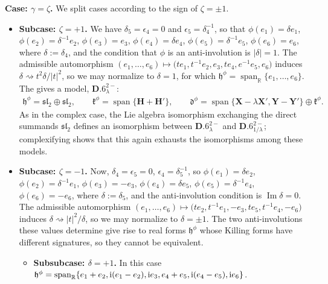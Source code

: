 \documentclass[10pt,a4paper]{amsart}
\newlength{\caseIndent}
\DeclareMathOperator{\spanOperator}{span}
\renewcommand{\Im}{\operatorname{Im}}
\newcommand{\Span}[1]{\spanOperator\{{#1}\}}
\newcommand{\bbR}{\mathbb{R}}
\newcommand{\mbH}{\mathbf{H}}
\newcommand{\mbX}{\mathbf{X}}
\newcommand{\mbY}{\mathbf{Y}}
\newcommand{\mfd} {\mathfrak{d}}
\newcommand{\mfh} {\mathfrak{h}}
\newcommand{\mfk} {\mathfrak{k}}
\newcommand{\mfsl} {\mathfrak{sl}}
\numberwithin{equation}{section}
\begin{document}
\noindent \textbf{Case: $\gamma = \zeta$.} We split cases according to the sign of $\zeta = \pm 1$.
\begin{itemize}[leftmargin=\caseIndent]\itemsep=0pt
	\item[] \textbf{Subcase: $\zeta = +1$.} We have $\delta_5 = \epsilon_4 = 0$ and $\epsilon_5 = \delta_4^{-1}$, so that $\phi(e_1) = \delta e_1$, $\phi(e_2) = \delta^{-1} e_2$, $\phi(e_3) = e_3$, $\phi(e_4) = \delta e_4$, $\phi(e_5) = \delta^{-1} e_5$, $\phi(e_6) = e_6$, where $\delta := \delta_4$, and the condition that $\phi$ is an anti-involution is $|\delta| = 1$. The admissible automorphism $(e_1, \ldots, e_6) \mapsto \big(t e_1, t^{-1} e_2, e_3, t e_4, e^{-1} e_5, e_6\big)$ induces $\delta \rightsquigarrow t^2 \delta / |t|^2$, so we may normalize to $\delta = 1$, for which $\mfh^{\phi} = \spanOperator_{\bbR}\{e_1, \ldots, e_6\}$. The gives a model, $\mathbf{D.6}_{\lambda}^{2-}$:
	\begin{gather*}
		\boxed{
			\mfh^{\phi} = \mfsl_2 \oplus \mfsl_2, \qquad
			\mfk^{\phi} = \Span{\mbH + \mbH'} , \qquad
			\mfd^{\phi} = \Span{\mbX - \lambda \mbX', \mbY - \mbY'} \oplus \mfk^{\phi} .
		}
	\end{gather*}
	As in the complex case, the Lie algebra isomorphism exchanging the direct summands $\mfsl_2$ defines an isomorphism between $\mathbf{D.6}_{\lambda}^{2-}$ and $\mathbf{D.6}_{1 / \lambda}^{2-}$; complexifying shows that this again exhausts the isomorphisms among these models.
	\item[] \textbf{Subcase: $\zeta = -1$.} Now, $\delta_4 = \epsilon_5 = 0$, $\epsilon_4 = \delta_5^{-1}$, so $\phi(e_1) = \delta e_2$, $\phi(e_2) = \delta^{-1} e_1$, $\phi(e_3) = -e_3$, $\phi(e_4) = \delta e_5$, $\phi(e_5) = \delta^{-1} e_4$, $\phi(e_6) = -e_6$, where $\delta := \delta_5$, and the anti-involution condition is $\Im \delta = 0$. The admissible automorphism $(e_1, \ldots, e_6) \mapsto \big(t e_2, t^{-1} e_1, -e_3, t e_5, t^{-1} e_4, -e_6\big)$ induces $\delta \rightsquigarrow |t|^2 / \delta$, so we may normalize to $\delta = \pm 1$. The two anti-involutions these values determine give rise to real forms $\mfh^{\phi}$ whose Killing forms have different signatures, so they cannot be equivalent.
\begin{itemize}[leftmargin=\caseIndent]\itemsep=0pt
	\item[] \textbf{Subsubcase: $\delta = +1$.} In this case $\mfh^{\phi} = \spanOperator_{\bbR}\{e_1 + e_2, {\rm i} (e_1 - e_2), {\rm i} e_3, e_4 + e_5, {\rm i} (e_4 - e_5), {\rm i} e_6\}$.
		\begin{itemize}[leftmargin=\caseIndent]\itemsep=0pt

\end{itemize}
\end{itemize}
\end{itemize}
\end{document}
